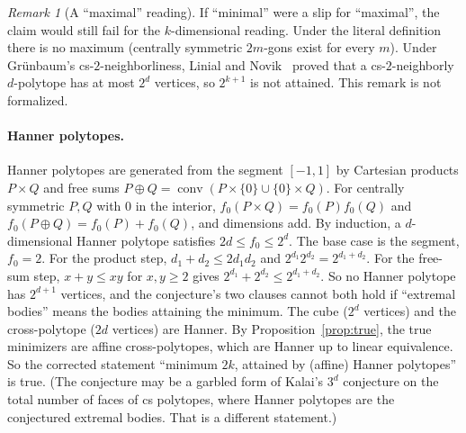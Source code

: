 \documentclass[11pt]{article}
\theoremstyle{definition}
\theoremstyle{remark}
\newtheorem{remark}[theorem]{Remark}
\begin{document}
\begin{remark}[A ``maximal'' reading]
If ``minimal'' were a slip for ``maximal'', the claim would still fail for the $k$-dimensional
reading. Under the literal definition there is no maximum (centrally symmetric $2m$-gons
exist for every $m$). Under Gr\"unbaum's cs-$2$-neighborliness, Linial and Novik~\cite{LN}
proved that a cs-$2$-neighborly $d$-polytope has at most $2^d$ vertices, so $2^{k+1}$ is not
attained. This remark is not formalized.
\end{remark}

\paragraph{Hanner polytopes.}
Hanner polytopes are generated from the segment $[-1,1]$ by Cartesian products
$P\times Q$ and free sums $P\oplus Q=\operatorname{conv}(P\times\{0\}\cup\{0\}\times Q)$.
For centrally symmetric $P,Q$ with $0$ in the interior,
$f_0(P\times Q)=f_0(P)f_0(Q)$ and $f_0(P\oplus Q)=f_0(P)+f_0(Q)$, and dimensions add.
By induction, a $d$-dimensional Hanner polytope satisfies $2d\le f_0\le 2^d$. The base
case is the segment, $f_0=2$. For the product step, $d_1+d_2\le 2d_1d_2$ and $2^{d_1}2^{d_2}=2^{d_1+d_2}$.
For the free-sum step, $x+y\le xy$ for $x,y\ge2$ gives $2^{d_1}+2^{d_2}\le2^{d_1+d_2}$.
So no Hanner polytope has $2^{d+1}$ vertices, and the conjecture's two clauses cannot both
hold if ``extremal bodies'' means the bodies attaining the minimum. The cube ($2^d$
vertices) and the cross-polytope ($2d$ vertices) are Hanner. By
Proposition~\ref{prop:true}, the true minimizers are affine cross-polytopes, which are
Hanner up to linear equivalence. So the corrected statement ``minimum $2k$, attained
by (affine) Hanner polytopes'' is true. (The conjecture may be a garbled form
of Kalai's $3^d$ conjecture on the total number of faces of cs polytopes, where Hanner
polytopes are the conjectured extremal bodies. That is a different statement.)
\end{document}
